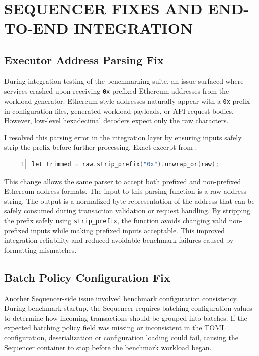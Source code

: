 \chapter{SEQUENCER FIXES AND END-TO-END INTEGRATION}

\section{Executor Address Parsing Fix}

During integration testing of the benchmarking suite, an issue surfaced where services crashed upon receiving \texttt{0x}-prefixed Ethereum addresses from the workload generator. Ethereum-style addresses naturally appear with a \texttt{0x} prefix in configuration files, generated workload payloads, or API request bodies. However, low-level hexadecimal decoders expect only the raw characters.

I resolved this parsing error in the integration layer by ensuring inputs safely strip the prefix before further processing. Exact excerpt from :

\begin{lstlisting}[language=C, numbers=left, breaklines=true, basicstyle=\ttfamily\small]
let trimmed = raw.strip_prefix("0x").unwrap_or(raw);
\end{lstlisting}

This change allows the same parser to accept both prefixed and non-prefixed Ethereum address formats. The input to this parsing function is a raw address string. The output is a normalized byte representation of the address that can be safely consumed during transaction validation or request handling. By stripping the prefix safely using \texttt{strip\_prefix}, the function avoids changing valid non-prefixed inputs while making prefixed inputs acceptable. This improved integration reliability and reduced avoidable benchmark failures caused by formatting mismatches.

\section{Batch Policy Configuration Fix}

Another Sequencer-side issue involved benchmark configuration consistency. During benchmark startup, the Sequencer requires batching configuration values to determine how incoming transactions should be grouped into batches. If the expected batching policy field was missing or inconsistent in the TOML configuration, deserialization or configuration loading could fail, causing the Sequencer container to stop before the benchmark workload began.

